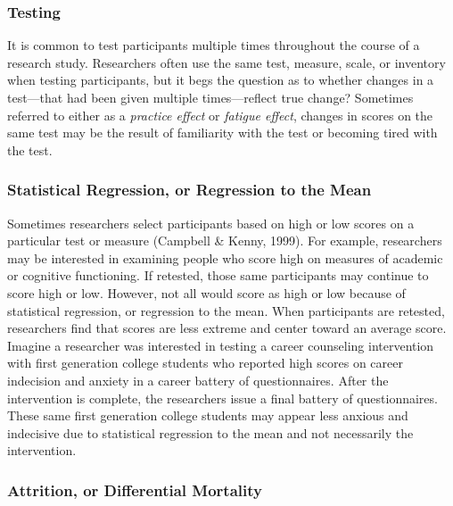 \documentclass[
  11pt,
]{book}
\begin{document}
\subsubsection{Testing}\label{testing}

It is common to test participants multiple times throughout the course of a research study. Researchers often use the same test, measure, scale, or inventory when testing participants, but it begs the question as to whether changes in a test---that had been given multiple times---reflect true change? Sometimes referred to either as a \emph{practice effect} or \emph{fatigue effect}, changes in scores on the same test may be the result of familiarity with the test or becoming tired with the test.

\subsubsection{Statistical Regression, or Regression to the Mean}\label{statistical-regression-or-regression-to-the-mean}

Sometimes researchers select participants based on high or low scores on a particular test or measure (Campbell \& Kenny, 1999). For example, researchers may be interested in examining people who score high on measures of academic or cognitive functioning. If retested, those same participants may continue to score high or low. However, not all would score as high or low because of statistical regression, or regression to the mean. When participants are retested, researchers find that scores are less extreme and center toward an average score. Imagine a researcher was interested in testing a career counseling intervention with first generation college students who reported high scores on career indecision and anxiety in a career battery of questionnaires. After the intervention is complete, the researchers issue a final battery of questionnaires. These same first generation college students may appear less anxious and indecisive due to statistical regression to the mean and not necessarily the intervention.

\subsubsection{Attrition, or Differential Mortality}\label{attrition-or-differential-mortality}
\end{document}
